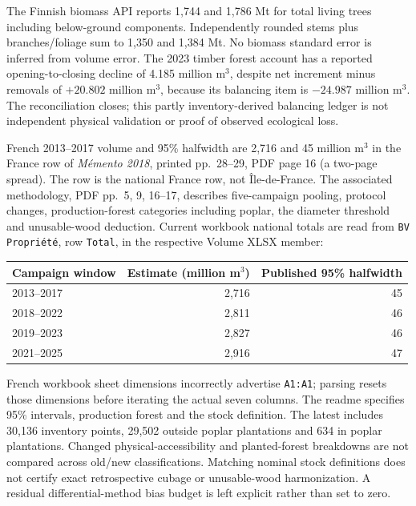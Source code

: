 The Finnish biomass API reports 1,744 and 1,786 Mt for total living trees including below-ground components. Independently rounded stems plus branches/foliage sum to 1,350 and 1,384 Mt. No biomass standard error is inferred from volume error. The 2023 timber forest account has a reported opening-to-closing decline of 4.185 million m$^3$, despite net increment minus removals of $+20.802$ million m$^3$, because its balancing item is $-24.987$ million m$^3$. The reconciliation closes; this partly inventory-derived balancing ledger is not independent physical validation or proof of observed ecological loss.

French 2013--2017 volume and 95\% halfwidth are 2,716 and 45 million m$^3$ in the France row of \emph{M\'emento 2018}, printed pp.~28--29, PDF page 16 (a two-page spread). The row is the national France row, not \^Ile-de-France. The associated methodology, PDF pp.~5, 9, 16--17, describes five-campaign pooling, protocol changes, production-forest categories including poplar, the diameter threshold and unusable-wood deduction. Current workbook national totals are read from \texttt{BV Propri\'et\'e}, row \texttt{Total}, in the respective Volume XLSX member:
\begin{center}\small
\begin{tabular}{lrr}\toprule
Campaign window & Estimate (million m$^3$) & Published 95\% halfwidth\\\midrule
2013--2017 & 2,716 & 45\\
2018--2022 & 2,811 & 46\\
2019--2023 & 2,827 & 46\\
2021--2025 & 2,916 & 47\\\bottomrule
\end{tabular}\end{center}

French workbook sheet dimensions incorrectly advertise \texttt{A1:A1}; parsing resets those dimensions before iterating the actual seven columns. The readme specifies 95\% intervals, production forest and the stock definition. The latest includes 30,136 inventory points, 29,502 outside poplar plantations and 634 in poplar plantations. Changed physical-accessibility and planted-forest breakdowns are not compared across old/new classifications. Matching nominal stock definitions does not certify exact retrospective cubage or unusable-wood harmonization. A residual differential-method bias budget is left explicit rather than set to zero.

